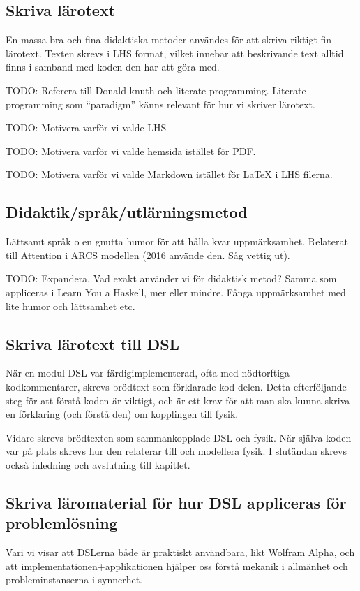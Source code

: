 \begin{binge}
  \section{Skriva lärotext}

  En massa bra och fina didaktiska metoder användes för att skriva
  riktigt fin lärotext. Texten skrevs i LHS format, vilket innebar att
  beskrivande text alltid finns i samband med koden den har att göra
  med.

  TODO: Referera till Donald knuth och literate programming. Literate
  programming som ``paradigm'' känns relevant för hur vi skriver
  lärotext.

  TODO: Motivera varför vi valde LHS

  TODO: Motivera varför vi valde hemsida istället för PDF.

  TODO: Motivera varför vi valde Markdown istället för LaTeX i LHS
  filerna.

  \subsection{Didaktik/språk/utlärningsmetod}

  Lättsamt språk o en gnutta humor för att hålla kvar
  uppmärksamhet. Relaterat till Attention i ARCS modellen (2016
  använde den. Såg vettig ut).

  TODO: Expandera. Vad exakt använder vi för didaktisk metod? Samma
  som appliceras i Learn You a Haskell, mer eller mindre. Fånga
  uppmärksamhet med lite humor och lättsamhet etc.

  \subsection{Skriva lärotext till DSL}

  När en modul DSL var färdigimplementerad, ofta med nödtorftiga
  kodkommentarer, skrevs brödtext som förklarade kod-delen. Detta
  efterföljande steg för att förstå koden är viktigt, och är ett krav
  för att man ska kunna skriva en förklaring (och förstå den) om
  kopplingen till fysik.

  Vidare skrevs brödtexten som sammankopplade DSL och fysik. När
  själva koden var på plats skrevs hur den relaterar till och
  modellera fysik. I slutändan skrevs också inledning och avslutning
  till kapitlet.

  \subsection{Skriva läromaterial för hur DSL appliceras för problemlösning}

  Vari vi visar att DSLerna både är praktiskt användbara, likt Wolfram
  Alpha, och att implementationen+applikationen hjälper oss förstå
  mekanik i allmänhet och probleminstanserna i synnerhet.
\end{binge}

